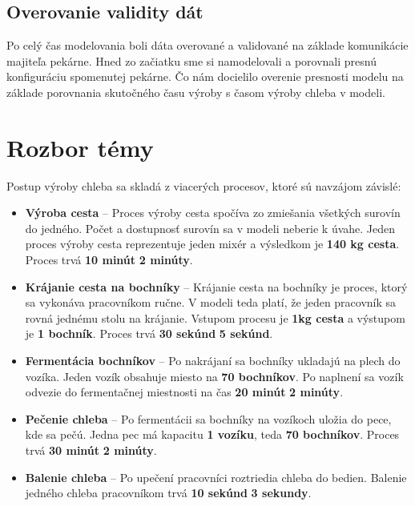 \documentclass[a4paper, 10pt]{article}
\begin{document}
    \subsection{Overovanie validity dát}
    Po celý čas modelovania boli dáta overované a validované na základe komunikácie majiteľa pekárne. Hned zo
    začiatku sme si namodelovali a porovnali presnú konfiguráciu spomenutej pekárne. Čo nám docielilo overenie
    presnosti modelu na základe porovnania skutočného času výroby s časom výroby chleba v modeli.


    \section {Rozbor témy}\label{sec:rozbor-temy}
    Postup výroby chleba sa skladá z viacerých procesov, ktoré sú navzájom závislé:
    \begin{itemize}
        \item \textbf{Výroba cesta} -- Proces výroby cesta spočíva zo zmiešania všetkých surovín do jedného. Počet
        a dostupnosť surovín sa v modeli neberie k úvahe. Jeden proces výroby cesta reprezentuje jeden mixér a
        výsledkom je \textbf{140 kg cesta}. Proces trvá \textbf{10 minút} \textpm \textbf{ 2 minúty}.

        \item \textbf{Krájanie cesta na bochníky} -- Krájanie cesta na bochníky je proces, ktorý sa vykonáva pracovníkom
        ručne. V modeli teda platí, že jeden pracovník sa rovná jednému stolu na krájanie. Vstupom procesu je
        \textbf{1kg cesta} a výstupom je \textbf{1 bochník}. Proces trvá \textbf{30 sekúnd} \textpm \textbf{ 5 sekúnd}.

        \item \textbf{Fermentácia bochníkov} -- Po nakrájaní sa bochníky ukladajú na plech do vozíka.
        Jeden vozík obsahuje miesto na \textbf{70 bochníkov}. Po naplnení sa vozík odvezie do fermentačnej miestnosti
        na čas  \textbf{20 minút} \textpm \textbf{ 2 minúty}.

        \item \textbf{Pečenie chleba} -- Po fermentácii sa bochníky na vozíkoch uložia do pece, kde sa pečú.
        Jedna pec má kapacitu \textbf{1 vozíku}, teda \textbf{70 bochníkov}. Proces trvá \textbf{30 minút} \textpm \textbf{ 2 minúty}.

        \item \textbf{Balenie chleba} -- Po upečení pracovníci roztriedia chleba do bedien. Balenie jedného chleba
        pracovníkom trvá \textbf{10 sekúnd} \textpm \textbf{ 3 sekundy}.
    \end{itemize}
\end{document}
